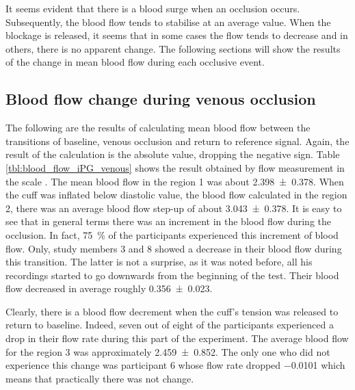 It seems evident that there is a blood surge when an occlusion occurs. Subsequently, the blood flow tends to stabilise at an average value. When the blockage is released, it seems that in some cases the flow tends to decrease and in others, there is no apparent change. The following sections will show the results of the change in mean blood flow during each occlusive event.


\subsection{Blood flow change during venous occlusion}
\label{sectio ban5.5.1}
The following are the results of calculating mean blood flow between the transitions of baseline, venous occlusion and return to reference signal. Again, the result of the calculation is the absolute value, dropping the negative sign. Table \ref{tbl:blood_flow_iPG_venous} shows the result obtained by flow measurement in the scale \si{\bfv}. The mean blood flow in the region 1 was about \SI{2.398(0378)}{\bfv}. When the cuff was inflated below diastolic value, the blood flow calculated in the region 2, there was an average blood flow step-up of about \SI{3.043(0378)}{\bfv}. It is easy to see that in general terms there was an increment in the blood flow during the occlusion. In fact, \SI{75}{\percent} of the participants experienced this increment of blood flow. Only, study members 3 and 8 showed a decrease in their blood flow during this transition. The latter is not a surprise, as it was noted before, all his recordings started to go downwards from the beginning of the test. Their blood flow decreased in average roughly \SI{0.356(0023)}{\bfv}.

Clearly, there is a blood flow decrement when the cuff's tension was released to return to baseline. Indeed, seven out of eight of the participants experienced a drop in their flow rate during this part of the experiment. The average blood flow for the region 3 was approximately \SI{2.459(0852)}{\bfv}. The only one who did not experience this change was participant 6 whose flow rate dropped \SI{-0.0101}{\bfv} which means that practically there was not change. 

